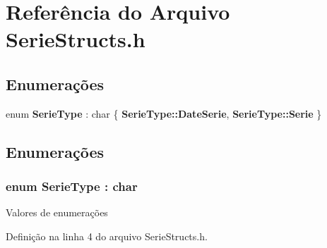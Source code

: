 \section{Referência do Arquivo Serie\+Structs.\+h}
\label{_serie_structs_8h}
\subsection*{Enumerações}
\begin{DoxyCompactItemize}
\item 
enum {\bf Serie\+Type} \+: char \{ {\bf Serie\+Type\+::\+Date\+Serie}, 
{\bf Serie\+Type\+::\+Serie}
 \}
\end{DoxyCompactItemize}


\subsection{Enumerações}
\subsubsection[{Serie\+Type}]{\setlength{\rightskip}{0pt plus 5cm}enum {\bf Serie\+Type} \+: char\hspace{0.3cm}{\ttfamily [strong]}}\label{_serie_structs_8h_af0bad4debcc2093479a379d5429534b8}
\begin{Desc}
\item[Valores de enumerações]\par
\begin{description}
\item[{\em 
Date\+Serie\label{_serie_structs_8h_af0bad4debcc2093479a379d5429534b8ab31bcd60d120e72baa55d593da707ada}
}]\item[{\em 
Serie\label{_serie_structs_8h_af0bad4debcc2093479a379d5429534b8acd4b9482eadd1fea35dbf01c9a05b093}
}]\end{description}
\end{Desc}


Definição na linha 4 do arquivo Serie\+Structs.\+h.

